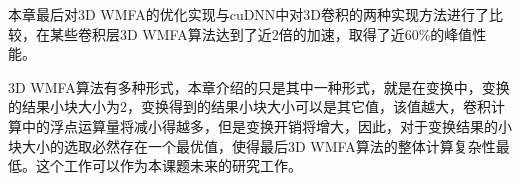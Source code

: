本章最后对3D WMFA的优化实现与cuDNN中对3D卷积的两种实现方法进行了比较，在某些卷积层3D WMFA算法达到了近2倍的加速，取得了近60\%的峰值性能。

3D WMFA算法有多种形式，本章介绍的只是其中一种形式，就是在变换中，变换的结果小块大小为2，变换得到的结果小块大小可以是其它值，该值越大，卷积计算中的浮点运算量将减小得越多，但是变换开销将增大，因此，对于变换结果的小块大小的选取必然存在一个最优值，使得最后3D WMFA算法的整体计算复杂性最低。这个工作可以作为本课题未来的研究工作。
























